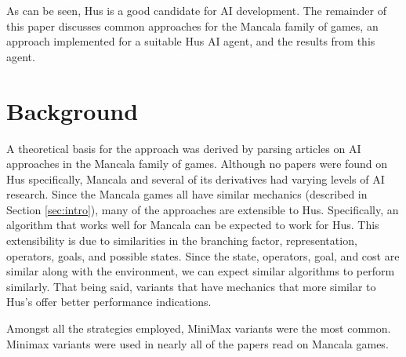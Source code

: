 \documentclass[]{article}
\begin{document}



As can be seen, Hus is a good candidate for AI development. The remainder of this paper discusses common approaches for the Mancala family of games, an approach implemented for a suitable Hus AI agent, and the results from this agent. 


\section{Background}
\label{sec:Background}
A theoretical basis for the approach was derived by parsing articles on AI approaches in the Mancala family of games. Although no papers were found on Hus specifically, Mancala and several of its derivatives had varying levels of AI research. Since the Mancala games all have similar mechanics (described in Section \ref{sec:intro}), many of the approaches are extensible to Hus. Specifically, an algorithm that works well for Mancala can be expected to work for Hus. This extensibility is due to similarities in the branching factor, representation, operators, goals, and possible states. Since the state, operators, goal, and cost are similar along with the environment, we can expect similar algorithms to perform similarly. That being said, variants that have mechanics that more similar to Hus's offer better performance indications.

Amongst all the strategies employed, MiniMax variants were the most common. Minimax variants were used in nearly all of the papers read on Mancala games. %
\end{document}
